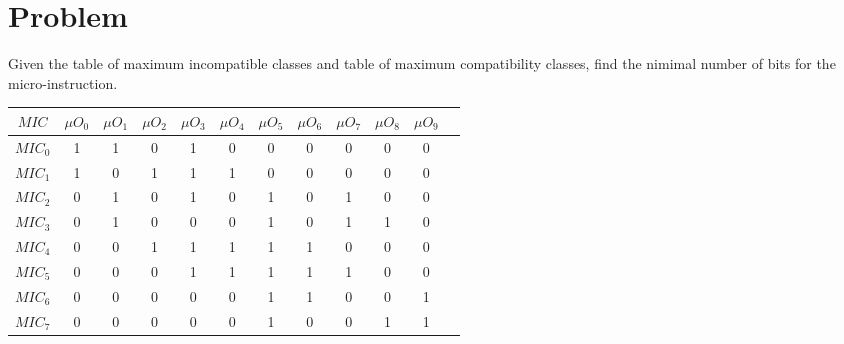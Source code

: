 \section*{Problem}

Given the table of maximum incompatible classes and table of maximum compatibility classes, find the nimimal number of bits for the micro-instruction.

\begin{table}[H]
    \centering
        \begin{tabular}{|c|c|c|c|c|c|c|c|c|c|c|c|}
            \hline
            $MIC$ & $\mu O_{0}$ & $\mu O_{1}$ & $\mu O_{2}$ & $\mu O_{3}$ & $\mu O_{4}$ & $\mu O_{5}$ & $\mu O_{6}$ & $\mu O_{7}$ & $\mu O_{8}$ & $\mu O_{9}$ \\ \hline
            $MIC_{0}$ & 1 & 1 & 0 & 1 & 0 & 0 & 0 & 0 & 0 & 0 \\ \hline
            $MIC_{1}$ & 1 & 0 & 1 & 1 & 1 & 0 & 0 & 0 & 0 & 0 \\ \hline
            $MIC_{2}$ & 0 & 1 & 0 & 1 & 0 & 1 & 0 & 1 & 0 & 0 \\ \hline
            $MIC_{3}$ & 0 & 1 & 0 & 0 & 0 & 1 & 0 & 1 & 1 & 0 \\ \hline
            $MIC_{4}$ & 0 & 0 & 1 & 1 & 1 & 1 & 1 & 0 & 0 & 0 \\ \hline
            $MIC_{5}$ & 0 & 0 & 0 & 1 & 1 & 1 & 1 & 1 & 0 & 0 \\ \hline
            $MIC_{6}$ & 0 & 0 & 0 & 0 & 0 & 1 & 1 & 0 & 0 & 1 \\ \hline
            $MIC_{7}$ & 0 & 0 & 0 & 0 & 0 & 1 & 0 & 0 & 1 & 1 \\ \hline
        \end{tabular}
\end{table}

